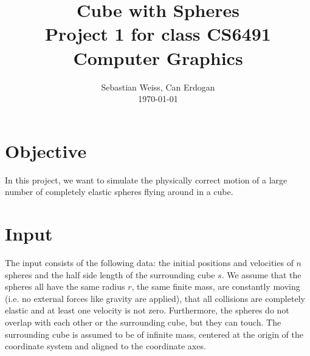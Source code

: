 \documentclass[journal, letterpaper]{IEEEtran}
\begin{document}
\title{Cube with Spheres \\
	{\large Project 1 for class CS6491 Computer Graphics}}
\author{Sebastian Weiss, Can Erdogan \\ \today}

\maketitle


\section{Objective}
In this project, we want to simulate the physically correct motion of a large number of completely elastic spheres flying around in a cube.

\section{Input}
The input consists of the following data: the initial positions and velocities of $n$ spheres and the half side length of the surrounding cube $s$.
We assume that the spheres all have the same radius $r$, the same finite mass, are constantly moving (i.e. no external forces like gravity are applied), that all collisions are completely elastic and at least one velocity is not zero. Furthermore, the spheres do not overlap with each other or the surrounding cube, but they can touch. The surrounding cube is assumed to be of infinite mass, centered at the origin of the coordinate system and aligned to the coordinate axes.
\end{document}
